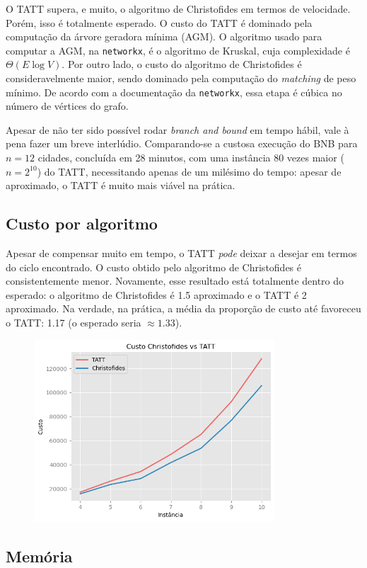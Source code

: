 \documentclass{article}
\begin{document}
O TATT supera, e muito, o algoritmo de Christofides em termos de velocidade. Porém, isso é totalmente esperado. O custo do TATT é dominado pela computação da árvore geradora mínima (AGM). O algoritmo usado para computar a AGM, na \texttt{networkx}, é o algoritmo de Kruskal, cuja complexidade é \( \Theta(E \log V) \). Por outro lado, o custo do algoritmo de Christofides é consideravelmente maior, sendo dominado pela computação do \textit{matching} de peso mínimo. De acordo com a documentação da \texttt{networkx}, essa etapa é cúbica no número de vértices do grafo.

Apesar de não ter sido possível rodar \textit{branch and bound} em tempo hábil, vale à pena fazer um breve interlúdio. Comparando-se a custosa execução do BNB para \( n = 12 \) cidades, concluída em 28 minutos, com uma instância 80 vezes maior (\( n = 2^{10} \)) do TATT, necessitando apenas de um milésimo do tempo: apesar de aproximado, o TATT é muito mais viável na prática.

\subsection{Custo por algoritmo}

Apesar de compensar muito em tempo, o TATT \textit{pode} deixar a desejar em termos do ciclo encontrado. O custo obtido pelo algoritmo de Christofides é consistentemente menor. Novamente, esse resultado está totalmente dentro do esperado: o algoritmo de Christofides é 1.5 aproximado e o TATT é 2 aproximado. Na verdade, na prática, a média da proporção de custo até favoreceu o TATT: 1.17 (o esperado seria \( \approx 1.33 \)).

\begin{figure} [H]
	\includegraphics[width=9cm]{custo_vs}
	\centering
\end{figure}

\subsection{Memória}
\end{document}
